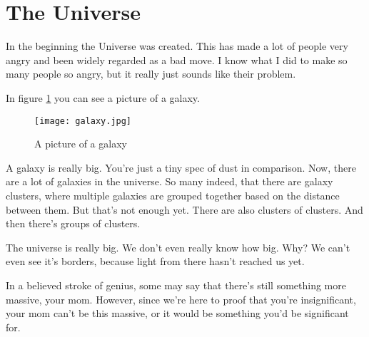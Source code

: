 \maketitle
\section*{The Universe}
In the beginning the Universe was created. This has made a lot of people very angry and been widely regarded as a bad move.
I know what I did to make so many people so angry, but it really just sounds like their problem.

In figure \ref{fig:universe} you can see a picture of a galaxy.

\begin{figure}[h]
  \center
  \texttt{[image: galaxy.jpg]}
  \caption{A picture of a galaxy}
  \label{fig:universe}
\end{figure}

A galaxy is really big. You're just a tiny spec of dust in comparison. Now, there are a lot of galaxies in the universe.
So many indeed, that there are galaxy clusters, where multiple galaxies are grouped together based on the distance between them.
But that's not enough yet. There are also clusters of clusters. And then there's groups of clusters.

The universe is really big. We don't even really know how big. Why? We can't even see it's borders, because light from there hasn't reached us yet.

In a believed stroke of genius, some may say that there's still something more massive, your mom. However, since we're here to proof that you're insignificant,
your mom can't be this massive, or it would be something you'd be significant for.

\pagebreak


